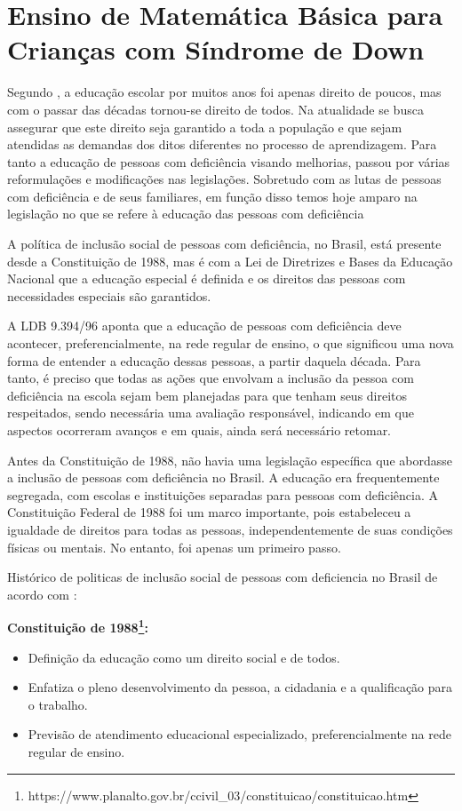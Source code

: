 \section{Ensino de Matemática Básica para Crianças com Síndrome de Down }

Segundo \cite{fonseca2016concepccao}, a educação escolar por muitos anos foi apenas direito de poucos, mas com o passar das décadas tornou-se direito de todos. Na atualidade se busca assegurar que este direito seja garantido a toda a população e que sejam atendidas as demandas dos ditos diferentes no processo de aprendizagem. Para tanto a educação de pessoas com deficiência visando melhorias, passou por várias reformulações e modificações nas legislações. Sobretudo com as lutas de pessoas com deficiência e de seus familiares, em função disso temos hoje amparo na legislação no que se refere à educação das pessoas com deficiência 

A política de inclusão social de pessoas com deficiência, no Brasil, está presente desde
a Constituição de 1988, mas é com a Lei de Diretrizes e Bases da Educação Nacional que a
educação especial é definida e os direitos das pessoas com necessidades especiais são
garantidos. \cite{silva2020ensino}

A LDB 9.394/96 aponta que a educação de pessoas com deficiência deve
acontecer, preferencialmente, na rede regular de ensino, o que significou uma nova
forma de entender a educação dessas pessoas, a partir daquela década. Para tanto,
é preciso que todas as ações que envolvam a inclusão da pessoa com deficiência na
escola sejam bem planejadas para que tenham seus direitos respeitados, sendo
necessária uma avaliação responsável, indicando em que aspectos ocorreram
avanços e em quais, ainda será necessário retomar. \cite{lima2022sistema}

Antes da Constituição de 1988, não havia uma legislação específica que abordasse a inclusão de pessoas com deficiência no Brasil. A educação era frequentemente segregada, com escolas e instituições separadas para pessoas com deficiência. A Constituição Federal de 1988 foi um marco importante, pois estabeleceu a igualdade de direitos para todas as pessoas, independentemente de suas condições físicas ou mentais. No entanto, foi apenas um primeiro passo.

Histórico de politicas de inclusão social de pessoas com deficiencia no Brasil de acordo com \cite{silva2020ensino}:

    \textbf{Constituição de 1988\footnote{https://www.planalto.gov.br/ccivil\_03/constituicao/constituicao.htm}:}
    \begin{itemize}
        \item Definição da educação como um direito social e de todos.
        \item Enfatiza o pleno desenvolvimento da pessoa, a cidadania e a qualificação para o trabalho.
        \item Previsão de atendimento educacional especializado, preferencialmente na rede regular de ensino.
    \end{itemize}
    
